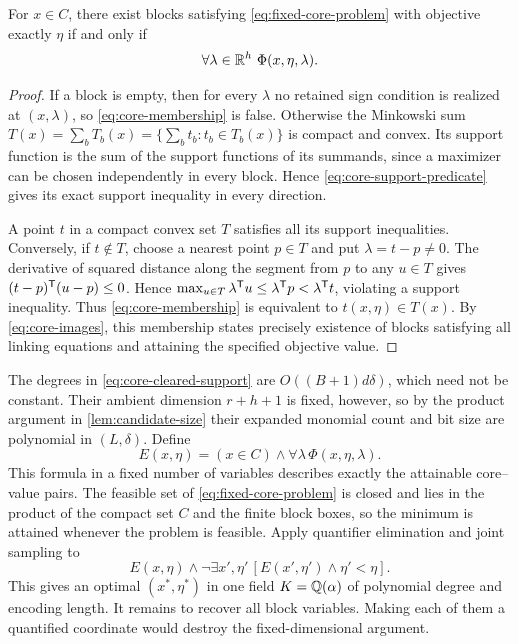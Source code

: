 \begin{lemma}\label{lem:core-support-membership}
For $x\in C$, there exist blocks satisfying
\eqref{eq:fixed-core-problem} with objective exactly $\eta$ if and only if
\begin{equation}\label{eq:core-membership}
                           \forall\lambda\in\R^h\ \Phi(x,\eta,\lambda).
\end{equation}
\end{lemma}
\begin{proof}
If a block is empty, then for every $\lambda$ no retained sign condition
is realized at $(x,\lambda)$, so \eqref{eq:core-membership} is false.
Otherwise the Minkowski sum
$T(x)=\sum_bT_b(x)=\{\sum_b t_b:t_b\in T_b(x)\}$ is compact and
convex. Its support function is the sum of the support functions of its
summands, since a maximizer can be chosen independently in every block.
Hence \eqref{eq:core-support-predicate} gives its exact support
inequality in every direction.

A point $t$ in a compact convex set $T$ satisfies all its support
inequalities. Conversely, if $t\notin T$, choose a nearest point
$p\in T$ and put $\lambda=t-p\ne0$. The derivative of squared
distance along the segment from $p$ to any $u\in T$ gives
$(t-p)^{\mathsf T}(u-p)\le0$. Hence
$\max_{u\in T}\lambda^{\mathsf T} u\le\lambda^{\mathsf T} p
<\lambda^{\mathsf T} t$, violating a support inequality.
Thus \eqref{eq:core-membership} is equivalent to $t(x,\eta)\in T(x)$.
By \eqref{eq:core-images}, this membership states precisely existence
of blocks satisfying all linking equations and attaining the specified
objective value.
\end{proof}

The degrees in \eqref{eq:core-cleared-support} are
$O((B+1)d\delta)$, which need not be constant. Their ambient dimension
$r+h+1$ is fixed, however, so by the product argument in
\cref{lem:candidate-size} their expanded monomial count and bit size
are polynomial in $(L,\delta)$. Define
\[
 E(x,\eta)=(x\in C)\wedge\forall\lambda\,\Phi(x,\eta,\lambda).
\]
This formula in a fixed number of variables describes exactly the
attainable core--value pairs. The feasible set of
\eqref{eq:fixed-core-problem} is closed and lies in the product of the
compact set $C$ and the finite block boxes, so the minimum is attained
whenever the problem is feasible. Apply quantifier elimination and joint
sampling to
\begin{equation}\label{eq:core-joint-optimum}
 E(x,\eta)\wedge
       \neg\exists x',\eta'\,[E(x',\eta')\wedge\eta'<\eta].
\end{equation}
This gives an optimal $(x^*,\eta^*)$ in one field
$K=\mathbb Q(\alpha)$ of polynomial degree and encoding length.
It remains to recover all block variables. Making each of them a
quantified coordinate would destroy the fixed-dimensional argument.

